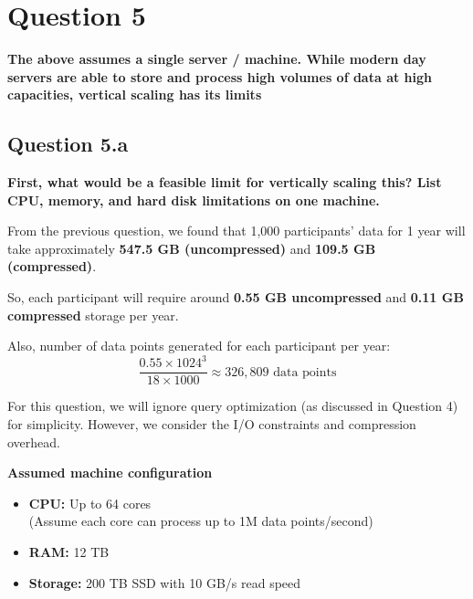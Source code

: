 \documentclass[a4paper, 12pt]{article}
\begin{document}
\break

\section*{Question 5}
\textbf{The above assumes a single server / machine. While modern day servers are able to store and process high volumes of data at high capacities, vertical scaling has its limits}

\subsection*{Question 5.a}
\textbf{First, what would be a feasible limit for vertically scaling this? List CPU, memory, and hard disk limitations on one machine.}

\vspace{0.5em}

From the previous question, we found that 1,000 participants' data for 1 year will take approximately \textbf{547.5 GB (uncompressed)} and \textbf{109.5 GB (compressed)}.

So, each participant will require around \textbf{0.55 GB uncompressed} and \textbf{0.11 GB compressed} storage per year.

\vspace{0.5em}

Also, number of data points generated for each participant per year:
\[
\frac{0.55 \times 1024^3}{18 \times 1000} \approx 326,809 \text{ data points}
\]

For this question, we will ignore query optimization (as discussed in Question 4) for simplicity. However, we consider the I/O constraints and compression overhead.

\vspace{0.75em}

\textbf{Assumed machine configuration}
\begin{itemize}
    \item \textbf{CPU:} Up to 64 cores \\
    (Assume each core can process up to 1M data points/second)
    
    \item \textbf{RAM:} 12 TB

    \item \textbf{Storage:} 200 TB SSD with 10 GB/s read speed
\end{itemize}
\end{document}
